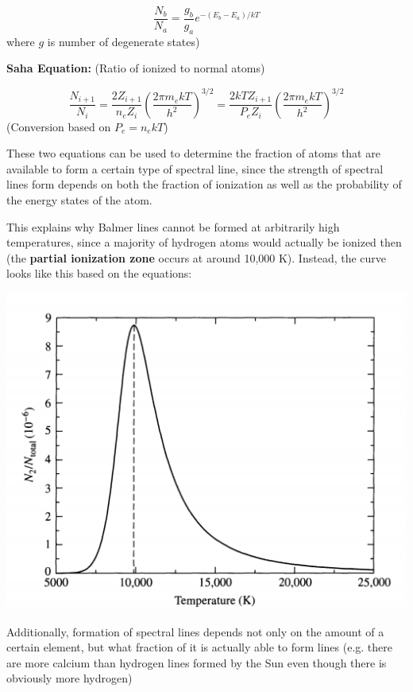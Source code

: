 \documentclass[12pt]{article}
\begin{document}
$$\dfrac{N_b}{N_a} = \dfrac{g_b}{g_a}e^{-(E_b - E_a)/kT}$$ where $g$ is number of degenerate states)

\textbf{Saha Equation:} (Ratio of ionized to normal atoms)

$$\dfrac{N_{i+1}}{N_i} = \dfrac{2Z_{i+1}}{n_eZ_i}\left(\frac{2\pi m_ekT}{h^2}\right)^{3/2} = \dfrac{2kTZ_{i+1}}{P_eZ_i}\left(\frac{2\pi m_ekT}{h^2}\right)^{3/2}$$ (Conversion based on $P_e = n_ekT$)\newline\newline

These two equations can be used to determine the fraction of atoms that are available to form a certain type of spectral line, since the strength of spectral lines form depends on both the fraction of ionization as well as the probability of the energy states of the atom.

This explains why Balmer lines cannot be formed at arbitrarily high temperatures, since a majority of hydrogen atoms would actually be ionized then (the \textbf{partial ionization zone} occurs at around 10,000 K). Instead, the curve looks like this based on the equations:

\includegraphics[scale=0.5]{Figures/BalmerLineCurve.png}

Additionally, formation of spectral lines depends not only on the amount of a certain element, but what fraction of it is actually able to form lines (e.g. there are more calcium than hydrogen lines formed by the Sun even though there is obviously more hydrogen)
\end{document}
